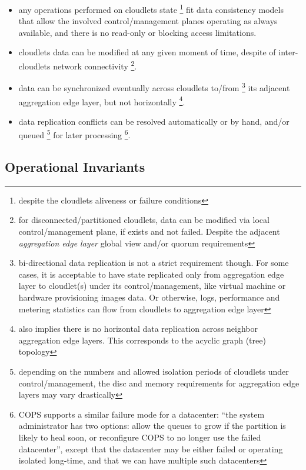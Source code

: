 \documentclass[conference]{IEEEtran}
\begin{document}
\begin{itemize}
  \item any operations performed on cloudlets state \footnote{despite the
    cloudlets aliveness or failure conditions} fit data consistency models that
    allow the involved control/management planes operating as always available,
    and there is no read-only or blocking access limitations.
  \item cloudlets data can be modified at any given moment of time, despite of
    inter-cloudlets network connectivity \footnote{for disconnected/partitioned
    cloudlets, data can be modified via local control/management plane, if
    exists and not failed. Despite the adjacent \textit{aggregation edge
    layer} \cite{b3} global view and/or quorum requirements}.
  \item data can be synchronized eventually across cloudlets to/from
    \footnote{bi-directional data replication is not a strict requirement
    though. For some cases, it is acceptable to have state replicated only from
    aggregation edge layer to cloudlet(s) under its control/management, like
    virtual machine or hardware provisioning images data. Or otherwise, logs,
    performance and metering statistics can flow from cloudlets to aggregation
    edge layer} its adjacent aggregation edge layer, but not horizontally
    \footnote{also implies there is no horizontal data replication across neighbor aggregation edge layers. This
    corresponds to the acyclic graph (tree) topology}.
  \item data replication conflicts can be resolved automatically or by hand,
    and/or queued \footnote{depending on the numbers and allowed isolation
    periods of cloudlets under control/management, the disc and memory
    requirements for aggregation edge layers may vary drastically} for later
    processing \footnote{COPS \cite{b1} supports a similar failure mode for a
    datacenter: ``the system administrator has two options: allow the queues to
    grow if the partition is likely to heal soon, or reconfigure COPS to no
    longer use the failed datacenter'', except that the datacenter may be
    either failed or operating isolated long-time, and that we can have
    multiple such datacenters}.
\end{itemize}

\subsection{Operational Invariants}
\end{document}
